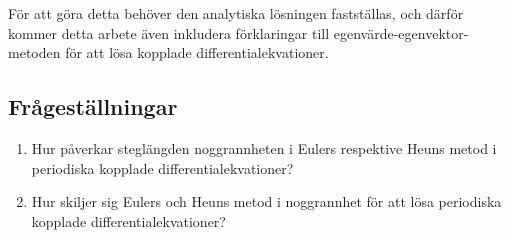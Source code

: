 För att göra detta behöver den analytiska lösningen fastställas, och därför kommer detta arbete även inkludera förklaringar till egenvärde-egenvektor-metoden för att lösa kopplade differentialekvationer.

\subsection{Frågeställningar}
\begin{enumerate}[label={\bfseries\Roman*}]%
\item Hur påverkar steglängden noggrannheten i Eulers respektive Heuns metod i periodiska kopplade differentialekvationer?
\item Hur skiljer sig Eulers och Heuns metod i noggrannhet för att lösa periodiska kopplade differentialekvationer?
\end{enumerate}
